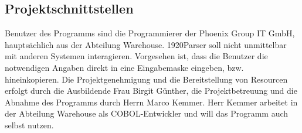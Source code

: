 \subsection{Projektschnittstellen}
\label{sec:Projektschnittstellen}
Benutzer des Programms sind die Programmierer der Phoenix Group IT GmbH, hauptsächlich aus der Abteilung Warehouse.
1920Parser soll nicht unmittelbar mit anderen Systemen interagieren. Vorgesehen ist, dass die Benutzer die notwendigen Angaben direkt in eine Eingabemaske eingeben, bzw. hineinkopieren.
Die Projektgenehmigung und die Bereitstellung von Resourcen erfolgt durch die Ausbildende Frau Birgit Günther, die Projektbetreuung und die Abnahme des Programms durch Herrn Marco Kemmer. Herr Kemmer arbeitet in der Abteilung Warehouse als COBOL-Entwickler und will das Programm auch selbst nutzen.

